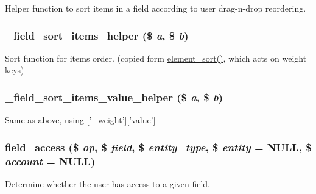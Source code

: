 \label{group__field_ga8ce2774a8371d5435ef06e13bfc93246}
Helper function to sort items in a field according to user drag-\/n-\/drop reordering. \hypertarget{group__field_gae7d9330807ba1d474f79b67a3dae6113}{
\subsubsection[{\_\-field\_\-sort\_\-items\_\-helper}]{\setlength{\rightskip}{0pt plus 5cm}\_\-field\_\-sort\_\-items\_\-helper (\$ {\em a}, \/  \$ {\em b})}}
\label{group__field_gae7d9330807ba1d474f79b67a3dae6113}
Sort function for items order. (copied form \hyperlink{common_8inc_a61f0cc62072ab44aa349478fb7219c74}{element\_\-sort()}, which acts on weight keys) \hypertarget{group__field_ga45c6b3ea588e59013c78e1b74e1b94a5}{
\subsubsection[{\_\-field\_\-sort\_\-items\_\-value\_\-helper}]{\setlength{\rightskip}{0pt plus 5cm}\_\-field\_\-sort\_\-items\_\-value\_\-helper (\$ {\em a}, \/  \$ {\em b})}}
\label{group__field_ga45c6b3ea588e59013c78e1b74e1b94a5}
Same as above, using \mbox{[}'\_\-weight'\mbox{]}\mbox{[}'value'\mbox{]} \hypertarget{group__field_gad363d4b50f9326e85cbf1180cd848b3b}{
\subsubsection[{field\_\-access}]{\setlength{\rightskip}{0pt plus 5cm}field\_\-access (\$ {\em op}, \/  \$ {\em field}, \/  \$ {\em entity\_\-type}, \/  \$ {\em entity} = {\ttfamily NULL}, \/  \$ {\em account} = {\ttfamily NULL})}}
\label{group__field_gad363d4b50f9326e85cbf1180cd848b3b}
Determine whether the user has access to a given field.


